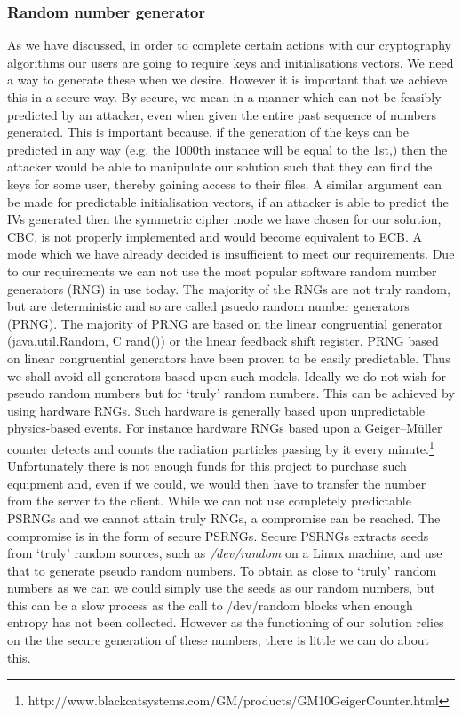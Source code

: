 \documentclass[12pt, titlepage]{article}
\begin{document}
\subsubsection{Random number generator}
As we have discussed, in order to complete certain actions with our cryptography algorithms our users are going to require keys and initialisations vectors. We need a way to generate these when we desire. However it is important that we achieve this in a secure way. By secure, we mean in a manner which can not be feasibly predicted by an attacker, even when given the entire past sequence of numbers generated. This is important because, if the generation of the keys can be predicted in any way (e.g. the 1000th instance will be equal to the 1st,) then the attacker would be able to manipulate our solution such that they can find the keys for some user, thereby gaining access to their files. A similar argument can be made for predictable initialisation vectors, if an attacker is able to predict the IVs generated then the symmetric cipher mode we have chosen for our solution, CBC, is not properly implemented and would become equivalent to ECB. A mode which we have already decided is insufficient to meet our requirements.
\newline \indent Due to our requirements we can not use the most popular software random number generators (RNG) in use today. The majority of the RNGs are not truly random, but are deterministic and so are called psuedo random number generators (PRNG). The majority of PRNG are based on the linear congruential generator (java.util.Random, C rand()) or the linear feedback shift register. PRNG based on linear congruential generators have been proven to be easily predictable.\cite{lcgPRNGPredictable} Thus we shall avoid all generators based upon such models.
\newline \indent Ideally we do not wish for pseudo random numbers but for `truly' random numbers. This can be achieved by using hardware RNGs. Such hardware is generally based upon unpredictable physics-based events. For instance hardware RNGs based upon a Geiger–Müller counter detects and counts the radiation particles passing by it every minute.\footnote{http://www.blackcatsystems.com/GM/products/GM10GeigerCounter.html} Unfortunately there is not enough funds for this project to purchase such equipment and, even if we could, we would then have to transfer the number from the server to the client.
\newline \indent While we can not use completely predictable PSRNGs and we cannot attain truly RNGs, a compromise can be reached. The compromise is in the form of secure PSRNGs. Secure PSRNGs extracts seeds from `truly' random sources, such as \textit{/dev/random} on a Linux machine, and use that to generate pseudo random numbers. To obtain as close to `truly' random numbers as we can we could simply use the seeds as our random numbers, but this can be a slow process as the call to /dev/random blocks when enough entropy has not been collected. However as the functioning of our solution relies on the the secure generation of these numbers, there is little we can do about this.
\end{document}
